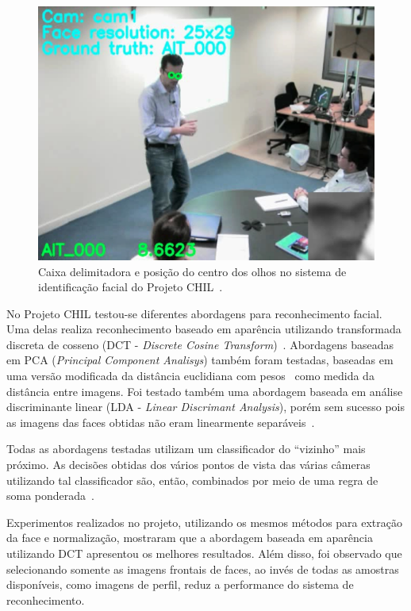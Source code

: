 	\begin{figure}[hbt]
		\begin{center}
			\includegraphics[scale=0.4]{figuras/3.TrabalhosCorrelatos/chil.png}
		\end{center}
		\caption{Caixa delimitadora e posição do centro dos olhos no sistema de identificação facial do Projeto CHIL~\cite{chil}.}
		\label{chil}
	\end{figure}


No Projeto CHIL testou-se diferentes abordagens para reconhecimento facial. Uma delas realiza reconhecimento baseado em aparência utilizando transformada discreta de cosseno (DCT - \textit{Discrete Cosine Transform})~\cite{chilref6, chilref7}. Abordagens baseadas em PCA (\textit{Principal Component Analisys}) também foram testadas, baseadas em uma versão modificada da distância euclidiana com pesos~\cite{chilref8, chilref9} como medida da distância entre imagens. Foi testado também uma abordagem baseada em análise discriminante linear (LDA - \textit{Linear Discrimant Analysis}), porém sem sucesso pois as imagens das faces obtidas não eram linearmente separáveis~\cite{chilref8, chilref9}. 

Todas as abordagens testadas utilizam um classificador do ``vizinho'' mais próximo. As decisões obtidas dos vários pontos de vista das várias câmeras utilizando tal classificador são, então, combinados por meio de uma regra de soma ponderada~\cite{chilref8, chilref9}.

Experimentos realizados no projeto, utilizando os mesmos métodos para extração da face e normalização, mostraram que a abordagem baseada em aparência utilizando DCT apresentou os melhores resultados. Além disso, foi observado que selecionando somente as imagens frontais de faces, ao invés de todas as amostras disponíveis, como imagens de perfil, reduz a performance do sistema de reconhecimento. 

